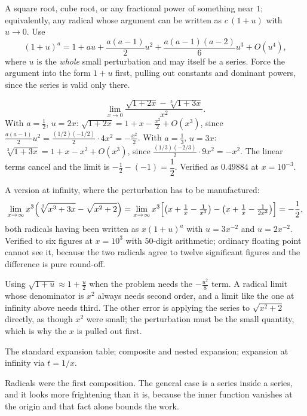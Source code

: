 \cue A square root, cube root, or any fractional power of something near $1$; equivalently, any radical whose argument can be written as $c\,(1+u)$ with $u\to0$.
\method Use
\[
(1+u)^{a}=1+au+\frac{a(a-1)}{2}u^{2}+\frac{a(a-1)(a-2)}{6}u^{3}+O(u^{4}),
\]
where $u$ is the \emph{whole} small perturbation and may itself be a series. Force the argument into the form $1+u$ first, pulling out constants and dominant powers, since the series is valid only there.

\begin{worked}
\[
\lim_{x\to0}\frac{\sqrt{1+2x}-\sqrt[3]{1+3x}}{x^{2}}.
\]
With $a=\tfrac12$, $u=2x$: $\sqrt{1+2x}=1+x-\tfrac{x^{2}}{2}+O(x^{3})$, since $\tfrac{a(a-1)}{2}u^{2}=\tfrac{(1/2)(-1/2)}{2}\cdot4x^{2}=-\tfrac{x^{2}}{2}$. With $a=\tfrac13$, $u=3x$: $\sqrt[3]{1+3x}=1+x-x^{2}+O(x^{3})$, since $\tfrac{(1/3)(-2/3)}{2}\cdot9x^{2}=-x^{2}$. The linear terms cancel and the limit is $-\tfrac12-(-1)=\dfrac12$. Verified as $0.49884$ at $x=10^{-3}$.

A version at infinity, where the perturbation has to be manufactured:
\[
\lim_{x\to\infty}x^{3}\Bigl(\sqrt[3]{x^{3}+3x}-\sqrt{x^{2}+2}\Bigr)
=\lim_{x\to\infty}x^{3}\Bigl[\bigl(x+\tfrac1x-\tfrac1{x^{3}}\bigr)-\bigl(x+\tfrac1x-\tfrac1{2x^{3}}\bigr)\Bigr]=-\frac12 ,
\]
both radicals having been written as $x(1+u)^{a}$ with $u=3x^{-2}$ and $u=2x^{-2}$. Verified to six figures at $x=10^{3}$ with $50$-digit arithmetic; ordinary floating point cannot see it, because the two radicals agree to twelve significant figures and the difference is pure round-off.
\end{worked}

\begin{trap}
Using $\sqrt{1+u}\approx1+\tfrac{u}{2}$ when the problem needs the $-\tfrac{u^{2}}{8}$ term. A radical limit whose denominator is $x^{2}$ always needs second order, and a limit like the one at infinity above needs third. The other error is applying the series to $\sqrt{x^{2}+2}$ directly, as though $x^{2}$ were small; the perturbation must be the small quantity, which is why the $x$ is pulled out first.
\end{trap}

\begin{seealsob}The standard expansion table; composite and nested expansion; expansion at infinity via $t=1/x$.\end{seealsob}

Radicals were the first composition. The general case is a series inside a series, and it looks more frightening than it is, because the inner function vanishes at the origin and that fact alone bounds the work.

